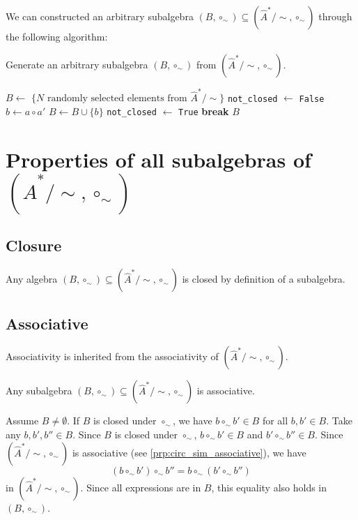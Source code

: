 We can constructed an arbitrary subalgebra $(B, \circ_{\sim}) \subseteq (\hat{A}^{*}/\sim, \circ_{\sim})$ through the following algorithm:
\begin{algorithm}[H]
\caption{
Generate an arbitrary subalgebra $(B, \circ_{\sim})$ from $(\hat{A}^{*}/\sim, \circ_{\sim})$.
}
\hrulefill
\begin{algorithmic}[1]
\State $B \gets$ $\{ N \text{ randomly selected elements from } \hat{A}^{*}/\sim \}$
    \State \texttt{not\_closed} $\gets$ \texttt{False}
        \State $b \gets a \circ a'$
            \State $B \gets B \cup \{b\}$
            \State \texttt{not\_closed} $\gets$ \texttt{True}
        \EndIf
    \EndFor
        \State \textbf{break}
    \EndIf
\EndWhile
\State \Return $B$
\EndProcedure
\end{algorithmic}
\end{algorithm}

\section{
Properties of all subalgebras \texorpdfstring{of $(\hat{A}^{*}/\sim, \circ_{\sim})$}{}
}

\subsection{Closure}
Any algebra $(B, \circ_{\sim}) \subseteq (\hat{A}^{*}/\sim, \circ_{\sim})$ is closed by definition of a subalgebra.

\subsection{Associative}
Associativity is inherited from the associativity of $(\hat{A}^{*}/\sim, \circ_{\sim})$.
\begin{propositionE}\label{prp:any_subalgebra_associative}
    Any subalgebra $(B, \circ_{\sim}) \subseteq (\hat{A}^{*}/\sim, \circ_{\sim})$ is associative.
\end{propositionE}
\begin{proofE}
    Assume $B \neq \emptyset$.
    If $B$ is closed under $\circ_{\sim}$, we have $b \circ_{\sim} b' \in B$ for all $b,b' \in B$.
    Take any $b, b', b'' \in B$.
    Since $B$ is closed under $\circ_{\sim}$, $b \circ_{\sim} b' \in B$ and $b' \circ_{\sim} b'' \in B$.
    Since $(\hat{A}^{*}/\sim, \circ_{\sim})$ is associative (see \cref{prp:circ_sim_associative}), we have
    \begin{equation}
        (b \circ_{\sim} b') \circ_{\sim} b'' = b \circ_{\sim} (b' \circ_{\sim} b'')
    \end{equation}
    in $(\hat{A}^{*}/\sim, \circ_{\sim})$.
    Since all expressions are in $B$, this equality also holds in $(B, \circ_{\sim})$.
\end{proofE}

